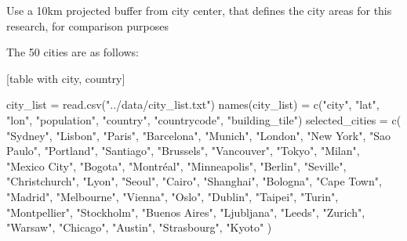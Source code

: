 \documentclass[
  sn-nature,
]{sn-jnl}
\newenvironment{Shaded}{\begin{snugshade}}{\end{snugshade}}
\newcommand{\FunctionTok}[1]{\textcolor[rgb]{0.28,0.35,0.67}{#1}}
\newcommand{\NormalTok}[1]{\textcolor[rgb]{0.00,0.23,0.31}{#1}}
\newcommand{\OtherTok}[1]{\textcolor[rgb]{0.00,0.23,0.31}{#1}}
\newcommand{\StringTok}[1]{\textcolor[rgb]{0.13,0.47,0.30}{#1}}
\begin{document}
Use a 10km projected buffer from city center, that defines the city
areas for this research, for comparison purposes

The 50 cities are as follows:

{[}table with city, country{]}

\begin{Shaded}
\begin{Highlighting}[]
\NormalTok{city\_list }\OtherTok{=} \FunctionTok{read.csv}\NormalTok{(}\StringTok{"../data/city\_list.txt"}\NormalTok{)}
\FunctionTok{names}\NormalTok{(city\_list) }\OtherTok{=} \FunctionTok{c}\NormalTok{(}\StringTok{"city"}\NormalTok{, }\StringTok{"lat"}\NormalTok{, }\StringTok{"lon"}\NormalTok{, }\StringTok{"population"}\NormalTok{, }\StringTok{"country"}\NormalTok{, }\StringTok{"countrycode"}\NormalTok{, }\StringTok{"building\_tile"}\NormalTok{)}
\NormalTok{selected\_cities }\OtherTok{=} \FunctionTok{c}\NormalTok{(}
    \StringTok{"Sydney"}\NormalTok{, }\StringTok{"Lisbon"}\NormalTok{, }\StringTok{"Paris"}\NormalTok{, }\StringTok{"Barcelona"}\NormalTok{,}
    \StringTok{"Munich"}\NormalTok{, }\StringTok{"London"}\NormalTok{, }\StringTok{"New York"}\NormalTok{, }\StringTok{"Sao Paulo"}\NormalTok{, }\StringTok{"Portland"}\NormalTok{, }\StringTok{"Santiago"}\NormalTok{,}
    \StringTok{"Brussels"}\NormalTok{, }\StringTok{"Vancouver"}\NormalTok{, }\StringTok{"Tokyo"}\NormalTok{, }\StringTok{"Milan"}\NormalTok{, }\StringTok{"Mexico City"}\NormalTok{, }\StringTok{"Bogota"}\NormalTok{, }\StringTok{"Montréal"}\NormalTok{, }\StringTok{"Minneapolis"}\NormalTok{, }\StringTok{"Berlin"}\NormalTok{,}
    \StringTok{"Seville"}\NormalTok{, }\StringTok{"Christchurch"}\NormalTok{,}
    \StringTok{"Lyon"}\NormalTok{, }\StringTok{"Seoul"}\NormalTok{, }\StringTok{"Cairo"}\NormalTok{, }\StringTok{"Shanghai"}\NormalTok{, }\StringTok{"Bologna"}\NormalTok{, }\StringTok{"Cape Town"}\NormalTok{, }\StringTok{"Madrid"}\NormalTok{, }\StringTok{"Melbourne"}\NormalTok{, }\StringTok{"Vienna"}\NormalTok{,}
    \StringTok{"Oslo"}\NormalTok{, }\StringTok{"Dublin"}\NormalTok{, }\StringTok{"Taipei"}\NormalTok{, }\StringTok{"Turin"}\NormalTok{, }\StringTok{"Montpellier"}\NormalTok{, }\StringTok{"Stockholm"}\NormalTok{, }\StringTok{"Buenos Aires"}\NormalTok{, }\StringTok{"Ljubljana"}\NormalTok{,}
    \StringTok{"Leeds"}\NormalTok{, }\StringTok{"Zurich"}\NormalTok{, }\StringTok{"Warsaw"}\NormalTok{, }\StringTok{"Chicago"}\NormalTok{, }\StringTok{"Austin"}\NormalTok{, }\StringTok{"Strasbourg"}\NormalTok{, }\StringTok{"Kyoto"}
\NormalTok{  )}


\end{Highlighting}
\end{Shaded}
\end{document}
